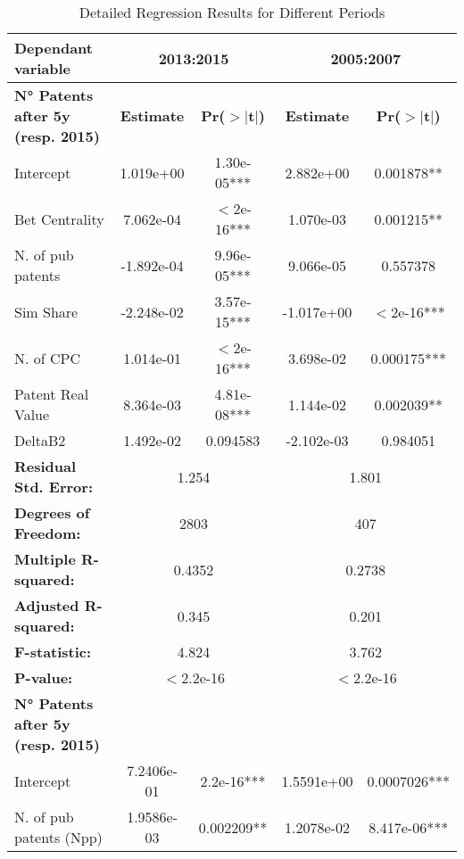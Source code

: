 \documentclass{article}
\begin{document}
\begin{table}[h!]
\centering
\caption{Detailed Regression Results for Different Periods}
\label{tab:regression_results}
\begin{tabular}{lcccc}
\toprule
\textbf{Dependant variable} & \multicolumn{2}{c}{\textbf{2013:2015}} & \multicolumn{2}{c}{\textbf{2005:2007}} \\
\midrule
\textbf{N° Patents after 5y (resp. 2015)} & \textbf{Estimate} & \textbf{Pr($>|$t$|$)} & \textbf{Estimate} & \textbf{Pr($>|$t$|$)} \\
\midrule
Intercept          & 1.019e+00 & 1.30e-05*** & 2.882e+00 & 0.001878** \\
Bet Centrality          & 7.062e-04 & $<$2e-16***   & 1.070e-03 & 0.001215** \\
N. of pub patents                  & -1.892e-04 & 9.96e-05*** & 9.066e-05 & 0.557378 \\
Sim Share           & -2.248e-02 & 3.57e-15*** & -1.017e+00 & $<$2e-16*** \\
N. of CPC             & 1.014e-01 & $<$2e-16***   & 3.698e-02 & 0.000175*** \\
Patent Real Value            & 8.364e-03 & 4.81e-08*** & 1.144e-02 & 0.002039** \\
DeltaB2                  & 1.492e-02 & 0.094583    & -2.102e-03 & 0.984051 \\
\midrule
\multicolumn{1}{l}{\textbf{Residual Std. Error:}} & \multicolumn{2}{c}{1.254} & \multicolumn{2}{c}{1.801} \\
\multicolumn{1}{l}{\textbf{Degrees of Freedom:}} & \multicolumn{2}{c}{2803} & \multicolumn{2}{c}{407} \\
\multicolumn{1}{l}{\textbf{Multiple R-squared:}} & \multicolumn{2}{c}{0.4352} & \multicolumn{2}{c}{0.2738} \\
\multicolumn{1}{l}{\textbf{Adjusted R-squared:}} & \multicolumn{2}{c}{0.345} & \multicolumn{2}{c}{0.201 } \\
\multicolumn{1}{l}{\textbf{F-statistic:}} & \multicolumn{2}{c}{4.824} & \multicolumn{2}{c}{3.762} \\
\multicolumn{1}{l}{\textbf{P-value:}} & \multicolumn{2}{c}{$<$2.2e-16} & \multicolumn{2}{c}{$<$2.2e-16} \\
\midrule
\textbf{N° Patents after 5y (resp. 2015)} & & & & \\
Intercept          & 7.2406e-01 & 2.2e-16***  & 1.5591e+00 & 0.0007026*** \\
N. of pub patents (Npp)    & 1.9586e-03 & 0.002209**    & 1.2078e-02 & 8.417e-06*** \\

\end{tabular}
\end{table}
\end{document}
